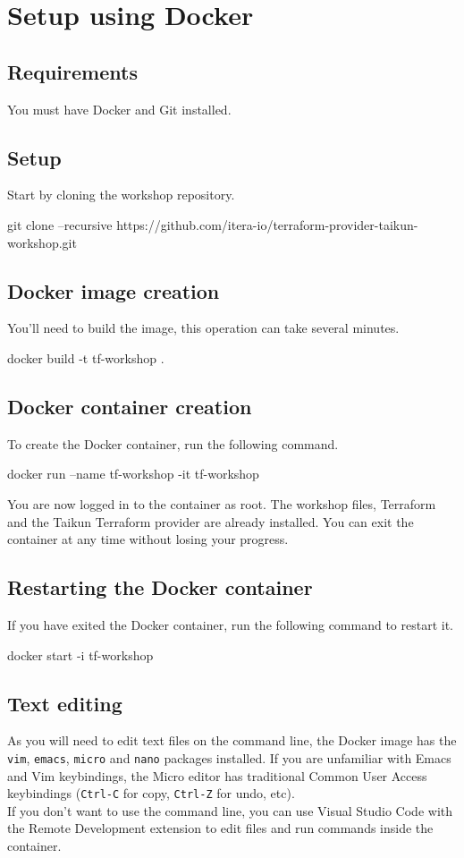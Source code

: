 \section{Setup using Docker}\label{sec:docker}

\subsection{Requirements}
You must have Docker and Git installed.

\subsection{Setup}
Start by cloning the workshop repository.
\begin{shell}
git clone --recursive https://github.com/itera-io/terraform-provider-taikun-workshop.git
\end{shell}

\subsection{Docker image creation}
You'll need to build the image, this operation can take several minutes.
\begin{shell}
docker build -t tf-workshop .
\end{shell}

\subsection{Docker container creation}
To create the Docker container, run the following command.
\begin{shell}
docker run --name tf-workshop -it tf-workshop
\end{shell}
You are now logged in to the container as root. The workshop files,
Terraform and the Taikun Terraform provider are already installed.
You can exit the container at any time without losing your progress.

\subsection{Restarting the Docker container}
If you have exited the Docker container, run the following command to restart it.
\begin{shell}
docker start -i tf-workshop
\end{shell}

\subsection{Text editing}
As you will need to edit text files on the command line,
the Docker image has the \texttt{vim},
\texttt{emacs}, \texttt{micro} and \texttt{nano} packages installed.
If you are unfamiliar with Emacs and Vim keybindings, the Micro editor
has traditional Common User Access keybindings (\texttt{Ctrl-C} for copy,
\texttt{Ctrl-Z} for undo, etc).\\

If you don't want to use the command line, you can use Visual Studio Code with
the Remote Development extension to edit files and run commands inside the
container.
